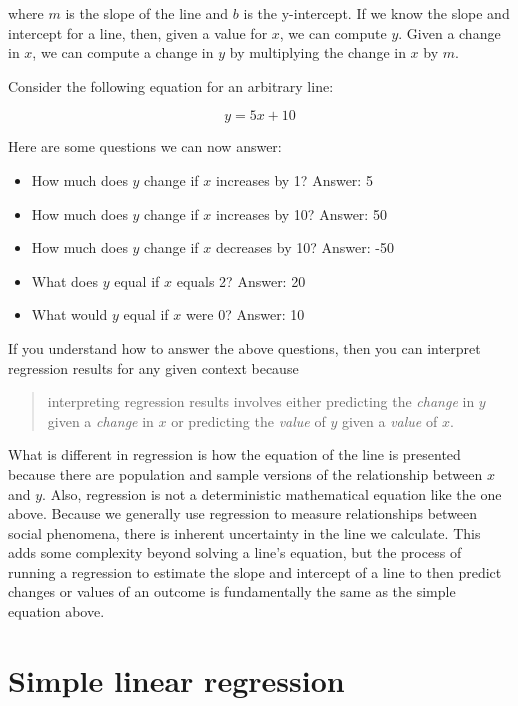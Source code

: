 \documentclass[
]{book}
\providecommand{\tightlist}{%
  \setlength{\itemsep}{0pt}\setlength{\parskip}{0pt}}
\begin{document}
where \(m\) is the slope of the line and \(b\) is the y-intercept. If we know the slope and intercept for a line, then, given a value for \(x\), we can compute \(y\). Given a change in \(x\), we can compute a change in \(y\) by multiplying the change in \(x\) by \(m\).

Consider the following equation for an arbitrary line:

\[y = 5x + 10\]

Here are some questions we can now answer:

\begin{itemize}
\tightlist
\item
  How much does \(y\) change if \(x\) increases by 1? Answer: 5
\item
  How much does \(y\) change if \(x\) increases by 10? Answer: 50
\item
  How much does \(y\) change if \(x\) decreases by 10? Answer: -50
\item
  What does \(y\) equal if \(x\) equals 2? Answer: 20
\item
  What would \(y\) equal if \(x\) were 0? Answer: 10
\end{itemize}

If you understand how to answer the above questions, then you can interpret regression results for any given context because

\begin{quote}
interpreting regression results involves either predicting the \emph{change} in \(y\) given a \emph{change} in \(x\) or predicting the \emph{value} of \(y\) given a \emph{value} of \(x\).
\end{quote}

What is different in regression is how the equation of the line is presented because there are population and sample versions of the relationship between \(x\) and \(y\). Also, regression is not a deterministic mathematical equation like the one above. Because we generally use regression to measure relationships between social phenomena, there is inherent uncertainty in the line we calculate. This adds some complexity beyond solving a line's equation, but the process of running a regression to estimate the slope and intercept of a line to then predict changes or values of an outcome is fundamentally the same as the simple equation above.

\hypertarget{simple-linear-regression}{%
\section{Simple linear regression}\label{simple-linear-regression}}
\end{document}
